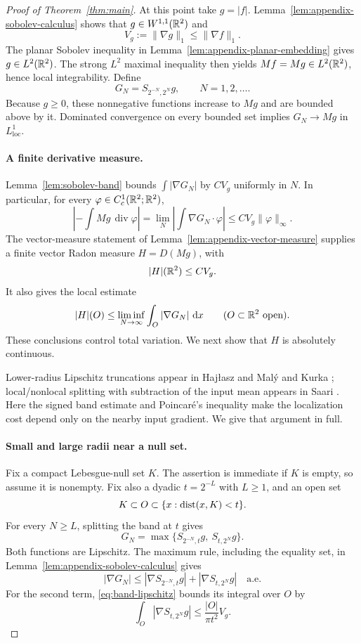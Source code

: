 \begin{proof}[Proof of Theorem~\ref{thm:main}]
At this point take $g=|f|$. Lemma~\ref{lem:appendix-sobolev-calculus}
shows that $g\in W^{1,1}(\mathbb R^2)$ and
\[
 V_g:=\|\nabla g\|_1\le\|\nabla f\|_1.
\]
The planar Sobolev inequality in
Lemma~\ref{lem:appendix-planar-embedding} gives $g\in L^2(\mathbb R^2)$.
The strong $L^2$ maximal inequality \cite[(1.2)]{Kinnunen1997}
then yields $Mf=Mg\in L^2(\mathbb R^2)$, hence local integrability.
Define
\[
 G_N=S_{2^{-N},2^N}g,\qquad N=1,2,\ldots.
\]
Because $g\ge0$, these nonnegative functions increase to $Mg$
and are bounded above by it. Dominated convergence on every bounded
set implies $G_N\to Mg$ in $L^1_{\mathrm{loc}}$.

\paragraph{A finite derivative measure.}
Lemma~\ref{lem:sobolev-band} bounds $\int|\nabla G_N|$ by
$CV_g$ uniformly in $N$. In particular, for every
$\varphi\in C_c^1(\mathbb R^2;\mathbb R^2)$,
\[
 \left|-\int Mg\,\operatorname{div}\varphi\right|
 =\lim_N\left|\int\nabla G_N\cdot\varphi\right|
 \le CV_g\|\varphi\|_\infty.
\]
The vector-measure statement of
Lemma~\ref{lem:appendix-vector-measure} supplies a finite vector
Radon measure $H=D(Mg)$, with
\begin{equation}\label{eq:variation-limit}
 |H|(\mathbb R^2)\le CV_g.
\end{equation}
It also gives the local estimate
\begin{equation}\label{eq:local-lsc}
 |H|(O)\le\liminf_{N\to\infty}\int_O|\nabla G_N|\,\mathop{}\!\mathrm{d} x
 \qquad(O\subset\mathbb R^2\text{ open}).
\end{equation}
These conclusions control total variation. We next show that $H$
is absolutely continuous.

Lower-radius Lipschitz truncations appear in Haj{\l}asz and Mal\'y
\cite[Lemma~8]{HajlaszMaly2010} and Kurka
\cite[Lemma~7.1]{Kurka2015}; local/nonlocal splitting with
subtraction of the input mean appears in Saari
\cite[Section~3.1]{Saari2019}. Here the signed band estimate and
Poincar\'e's inequality make the localization cost depend only
on the nearby input gradient. We give that argument in full.

\paragraph{Small and large radii near a null set.}
Fix a compact Lebesgue-null set $K$. The assertion is immediate
if $K$ is empty, so assume it is nonempty. Fix also a dyadic
$t=2^{-L}$ with $L\ge1$, and an open set
\[
 K\subset O\subset\{x:\operatorname{dist}(x,K)<t\}.
\]
For every $N\ge L$, splitting the band at $t$ gives
\[
 G_N=\max\{S_{2^{-N},t}g,\ S_{t,2^N}g\}.
\]
Both functions are Lipschitz. The maximum rule, including the
equality set, in Lemma~\ref{lem:appendix-sobolev-calculus} gives
\[
 |\nabla G_N|
 \le |\nabla S_{2^{-N},t}g|+|\nabla S_{t,2^N}g|
 \quad\text{a.e.}
\]
For the second term, \eqref{eq:band-lipschitz} bounds its integral
over $O$ by
\begin{equation}\label{eq:large-radius-null-cost}
 \int_O|\nabla S_{t,2^N}g|
       \le \frac{|O|}{\pi t^2}V_g.
\end{equation}


\end{proof}
